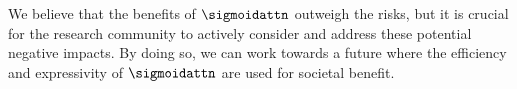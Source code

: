 We believe that the benefits of $\sigmoidattn$ outweigh the risks, but it is crucial for the research community to actively consider and address these potential negative impacts. By doing so, we can work towards a future where the efficiency and expressivity of $\sigmoidattn$ are used for societal benefit.
